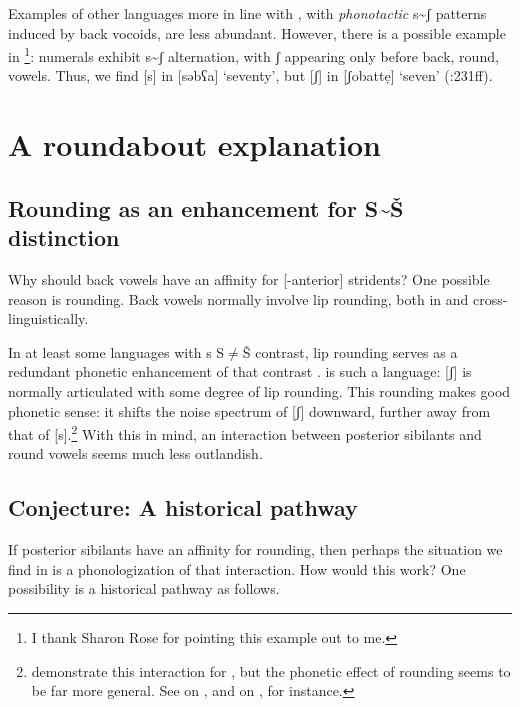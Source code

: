 \documentclass[output=paper,newtxmath,modfonts,nonflat,hidelinks]{langsci/langscibook}
\begin{document}
Examples of other languages more in line with , with \textit{phonotactic} s{\textasciitilde}ʃ patterns induced by back vocoids, are less abundant. However, there is a possible example in \footnote{I thank Sharon Rose for pointing this example out to me.}: numerals exhibit s{\textasciitilde}ʃ alternation, with ʃ appearing only before back, round, vowels. Thus, we find [s] in [səbʕa] ‘seventy’, but [ʃ] in [ʃobattẹ] ‘seven’ (\citealt{Banksira2000}:231ff). 

\section{A roundabout explanation}\label{sec:bennett:4}

\subsection{Rounding as an enhancement for S{\textasciitilde}Š distinction}\label{sec:bennett:4.1}

Why should back vowels have an affinity for [-anterior] stridents? One possible reason is rounding. Back vowels normally involve lip rounding, both in  and cross-linguistically. 

In at least some languages with s S${\neq}$Š contrast, lip rounding serves as a redundant phonetic enhancement of that contrast \citep{Stevens1986,Keyser&Stevens2006}.  is such a language: [ʃ] is normally articulated with some degree of lip rounding. This rounding makes good phonetic sense: it shifts the noise spectrum of [ʃ] downward, further away from that of [s].\footnote{\citet[49]{Keyser&Stevens2006} demonstrate this interaction for , but the phonetic effect of rounding seems to be far more general. See \citet[7]{NiChiosain&Padgett2001} on , and \citet[342-343]{McCollum2015} on , for instance.} With this in mind, an interaction between posterior sibilants and round vowels seems much less outlandish. 

\subsection{Conjecture: A historical pathway}\label{sec:bennett:4.2}

If posterior sibilants have an affinity for rounding, then perhaps the situation we find in  is a phonologization of that interaction. How would this work? One possibility is a historical pathway as follows.
\end{document}

